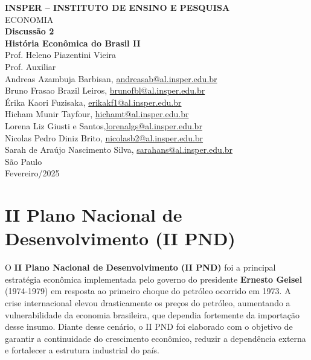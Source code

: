 \documentclass[a4paper,12pt]{article}[abntex2]
\begin{document}
\begin{titlepage}
    \centering
    \vspace*{1cm}
    \Large\textbf{INSPER – INSTITUTO DE ENSINO E PESQUISA}\\
    \Large ECONOMIA\\
    \vspace{1.5cm}
    \Large\textbf{Discussão 2}\\
    \textbf{História Econômica do Brasil II}\\
    \vspace{1.5cm}
    Prof. Heleno Piazentini Vieira \\
    Prof. Auxiliar  \\
    \vfill
    \normalsize
    Andreas Azambuja Barbisan, \href{mailto:andreasab@al.insper.edu.br}{andreasab@al.insper.edu.br}\\
    Bruno Frasao Brazil Leiros, \href{mailto:brunofbl@al.insper.edu.br}{brunofbl@al.insper.edu.br}\\
    Érika Kaori Fuzisaka, \href{mailto:erikakf1@al.insper.edu.br}{erikakf1@al.insper.edu.br}\\
    Hicham Munir Tayfour, \href{mailto:hichamt@al.insper.edu.br}{hichamt@al.insper.edu.br}\\
    Lorena Liz Giusti e Santos,\href{mailto:lorenalgs@al.insper.edu.br}{lorenalgs@al.insper.edu.br}\\
    Nicolas Pedro Diniz Brito, \href{mailto:nicolasb2@al.insper.edu.br}{nicolasb2@al.insper.edu.br}\\
    Sarah de Araújo Nascimento Silva, \href{mailto:sarahans@al.insper.edu.br}{sarahans@al.insper.edu.br}\\


    \vfill
    São Paulo\\
    Fevereiro/2025
\end{titlepage}

\newpage
\tableofcontents
\thispagestyle{empty} %

\newpage
\setcounter{page}{1} %
\justify
\onehalfspacing
\section{\textbf{II Plano Nacional de Desenvolvimento (II PND)}}

O \textbf{II Plano Nacional de Desenvolvimento (II PND)} foi a principal estratégia econômica implementada pelo governo do presidente \textbf{Ernesto Geisel} (1974-1979) em resposta ao primeiro choque do petróleo ocorrido em 1973. A crise internacional elevou drasticamente os preços do petróleo, aumentando a vulnerabilidade da economia brasileira, que dependia fortemente da importação desse insumo. Diante desse cenário, o II PND foi elaborado com o objetivo de garantir a continuidade do crescimento econômico, reduzir a dependência externa e fortalecer a estrutura industrial do país.
\end{document}
